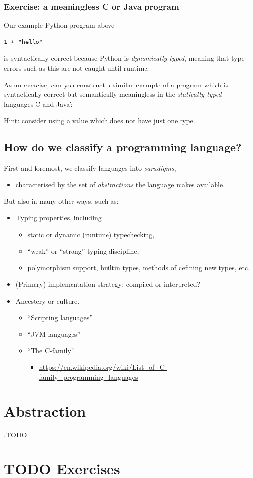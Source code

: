 \documentclass[11pt]{article}
\theoremstyle{definition}
\begin{document}
\subsubsection{Exercise: a meaningless C or Java program}
\label{sec:orgbf367d0}

Our example Python program above
\begin{verbatim}
1 + "hello"
\end{verbatim}
is syntactically correct because Python is \emph{dynamically typed},
meaning that type errors such as this are not caught until runtime.

As an exercise, can you construct a similar example
of a program which is syntactically correct
but semantically meaningless in the \emph{statically typed} languages
C and Java?

Hint: consider using a value which does not have just one type.

\subsection{How do we classify a programming language?}
\label{sec:orgfc2da29}

First and foremost, we classify languages into \emph{paradigms},
\begin{itemize}
\item characterised by the set of \emph{abstractions} the language makes available.
\end{itemize}

But also in many other ways, such as:
\begin{itemize}
\item Typing properties, including
\begin{itemize}
\item static or dynamic (runtime) typechecking,
\item “weak” or “strong” typing discipline,
\item polymorphism support, builtin types, methods of defining new types, etc.
\end{itemize}
\item (Primary) implementation strategy: compiled or interpreted?
\item Ancestery or culture.
\begin{itemize}
\item “Scripting languages”
\item “JVM languages”
\item “The C-family”
\begin{itemize}
\item \url{https://en.wikipedia.org/wiki/List\_of\_C-family\_programming\_languages}
\end{itemize}
\end{itemize}
\end{itemize}

\section{Abstraction}
\label{sec:org1815e28}
:TODO:

\section{{\bfseries\sffamily TODO} Exercises}
\label{sec:org366191f}
\end{document}
